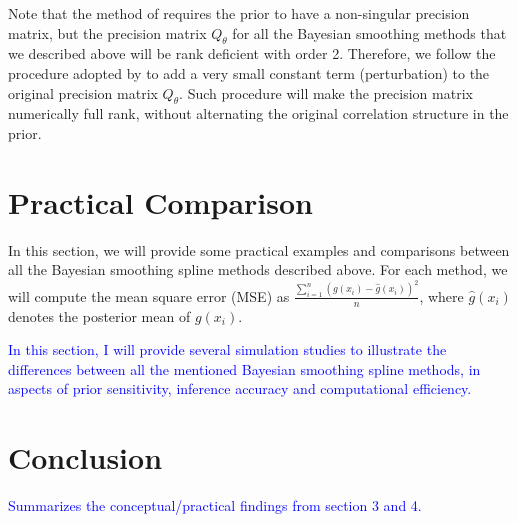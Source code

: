 \documentclass{article}
\newcommand{\ziang}{\textcolor{blue}}
\begin{document}
Note that the method of \cite{tierney1986accurate} requires the prior to have a non-singular precision matrix, but the precision matrix $Q_\theta$ for all the Bayesian smoothing methods that we described above will be rank deficient with order 2. Therefore, we follow the procedure adopted by \cite{wood2011fast} to add a very small constant term (perturbation) to the original precision matrix $Q_\theta$. Such procedure will make the precision matrix numerically full rank, without alternating the original correlation structure in the prior.

\section{Practical Comparison}\label{simulation}

In this section, we will provide some practical examples and comparisons between all the Bayesian smoothing spline methods described above. For each method, we will compute the mean square error (MSE) as $\frac{\sum_{i=1}^n (g(x_i) - \hat{g}(x_i))^2}{n}$, where $\hat{g}(x_i)$ denotes the posterior mean of $g(x_i)$. 



\ziang{In this section, I will provide several simulation studies to illustrate the differences between all the mentioned Bayesian smoothing spline methods, in aspects of prior sensitivity, inference accuracy and computational efficiency.}






\section{Conclusion}\label{conclusion}
\ziang{Summarizes the conceptual/practical findings from section 3 and 4.}

\newpage


\end{document}
